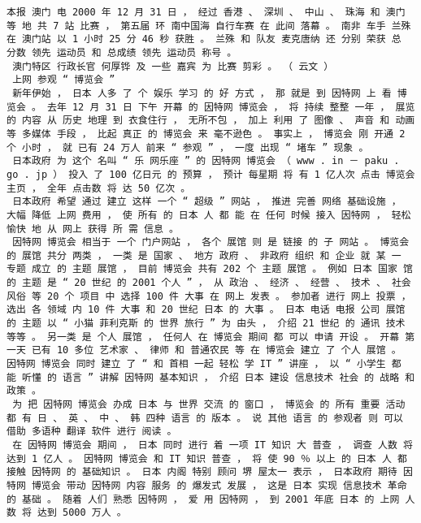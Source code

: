 \documentclass{article}
\begin{document}
\begin{Verbatim}[commandchars=\\\{\}]
 本报 澳门 电 2000 年 12 月 31 日 ， 经过 香港 、 深圳 、 中山 、 珠海 和 澳门 等 地 共 7 站 比赛 ， 第五届 环 南中国海 自行车赛 在 此间 落幕 。 南非 车手 兰殊 在 澳门站 以 1 小时 25 分 46 秒 获胜 。 兰殊 和 队友 麦克唐纳 还 分别 荣获 总 分数 领先 运动员 和 总成绩 领先 运动员 称号 。 
 澳门特区 行政长官 何厚铧 及 一些 嘉宾 为 比赛 剪彩 。 （ 云文 ） 
 上网 参观 “ 博览会 ” 
 新年伊始 ， 日本 人多 了 个 娱乐 学习 的 好 方式 ， 那 就是 到 因特网 上 看 博览会 。 去年 12 月 31 日 下午 开幕 的 因特网 博览会 ， 将 持续 整整 一年 ， 展览 的 内容 从 历史 地理 到 衣食住行 ， 无所不包 ， 加上 利用 了 图像 、 声音 和 动画 等 多媒体 手段 ， 比起 真正 的 博览会 来 毫不逊色 。 事实上 ， 博览会 刚 开通 2 个 小时 ， 就 已有 24 万人 前来 “ 参观 ” ， 一度 出现 “ 堵车 ” 现象 。 
 日本政府 为 这个 名叫 “ 乐 网乐座 ” 的 因特网 博览会 （ www . in － paku . go . jp ） 投入 了 100 亿日元 的 预算 ， 预计 每星期 将 有 1 亿人次 点击 博览会 主页 ， 全年 点击数 将 达 50 亿次 。 
 日本政府 希望 通过 建立 这样 一个 “ 超级 ” 网站 ， 推进 完善 网络 基础设施 ， 大幅 降低 上网 费用 ， 使 所有 的 日本 人 都 能 在 任何 时候 接入 因特网 ， 轻松愉快 地 从 网上 获得 所 需 信息 。 
 因特网 博览会 相当于 一个 门户网站 ， 各个 展馆 则 是 链接 的 子 网站 。 博览会 的 展馆 共分 两类 ， 一类 是 国家 、 地方 政府 、 非政府 组织 和 企业 就 某 一 专题 成立 的 主题 展馆 ， 目前 博览会 共有 202 个 主题 展馆 。 例如 日本 国家 馆 的 主题 是 “ 20 世纪 的 2001 个人 ” ， 从 政治 、 经济 、 经营 、 技术 、 社会 风俗 等 20 个 项目 中 选择 100 件 大事 在 网上 发表 。 参加者 进行 网上 投票 ， 选出 各 领域 内 10 件 大事 和 20 世纪 日本 的 大事 。 日本 电话 电报 公司 展馆 的 主题 以 “ 小猫 菲利克斯 的 世界 旅行 ” 为 由头 ， 介绍 21 世纪 的 通讯 技术 等等 。 另一类 是 个人 展馆 ， 任何人 在 博览会 期间 都 可以 申请 开设 。 开幕 第一天 已有 10 多位 艺术家 、 律师 和 普通农民 等 在 博览会 建立 了 个人 展馆 。 因特网 博览会 同时 建立 了 “ 和 首相 一起 轻松 学 IT ” 讲座 ， 以 “ 小学生 都 能 听懂 的 语言 ” 讲解 因特网 基本知识 ， 介绍 日本 建设 信息技术 社会 的 战略 和 政策 。 
 为 把 因特网 博览会 办成 日本 与 世界 交流 的 窗口 ， 博览会 的 所有 重要 活动 都 有 日 、 英 、 中 、 韩 四种 语言 的 版本 。 说 其他 语言 的 参观者 则 可以 借助 多语种 翻译 软件 进行 阅读 。 
 在 因特网 博览会 期间 ， 日本 同时 进行 着 一项 IT 知识 大 普查 ， 调查 人数 将 达到 1 亿人 。 因特网 博览会 和 IT 知识 普查 ， 将 使 90 ％ 以上 的 日本 人 都 接触 因特网 的 基础知识 。 日本 内阁 特别 顾问 堺 屋太一 表示 ， 日本政府 期待 因特网 博览会 带动 因特网 内容 服务 的 爆发式 发展 ， 这是 日本 实现 信息技术 革命 的 基础 。 随着 人们 熟悉 因特网 ， 爱 用 因特网 ， 到 2001 年底 日本 的 上网 人数 将 达到 5000 万人 。 

\end{Verbatim}
\end{document}
